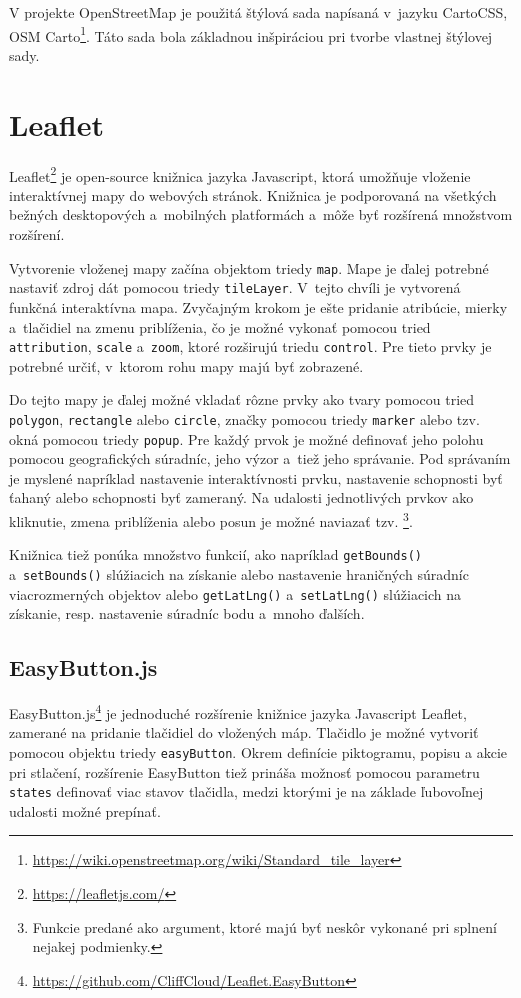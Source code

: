 V projekte OpenStreetMap je použitá štýlová sada napísaná v~jazyku CartoCSS, OSM Carto\footnote{\url{https://wiki.openstreetmap.org/wiki/Standard_tile_layer}}. Táto sada bola základnou inšpiráciou pri tvorbe vlastnej štýlovej sady.


\section{Leaflet}
\label{leaflet}
Leaflet\footnote{\url{https://leafletjs.com/}} je open-source knižnica jazyka Javascript, ktorá umožňuje vloženie interaktívnej mapy do webových stránok. Knižnica je podporovaná na všetkých bežných desktopových a~mobilných platformách a~môže byť rozšírená množstvom rozšírení.

Vytvorenie vloženej mapy začína objektom triedy {\tt map}. Mape je ďalej potrebné nastaviť zdroj dát pomocou triedy {\tt tileLayer}. V~tejto chvíli je vytvorená funkčná interaktívna mapa. Zvyčajným krokom je ešte pridanie atribúcie,  mierky a~tlačidiel na zmenu priblíženia, čo je možné vykonať pomocou tried {\tt attribution}, {\tt scale} a~{\tt zoom}, ktoré rozširujú triedu {\tt control}. Pre tieto prvky je potrebné určiť, v~ktorom rohu mapy majú byť zobrazené.

Do tejto mapy je ďalej možné vkladať rôzne prvky ako tvary pomocou tried {\tt polygon}, {\tt rectangle} alebo {\tt circle}, značky pomocou triedy {\tt marker} alebo tzv.  okná pomocou triedy {\tt popup}. Pre každý prvok je možné definovať jeho polohu pomocou geografických súradníc, jeho výzor a~tiež jeho správanie. Pod správaním je myslené napríklad nastavenie interaktívnosti prvku, nastavenie schopnosti byť ťahaný alebo schopnosti byť zameraný. Na udalosti jednotlivých prvkov ako kliknutie, zmena priblíženia alebo posun je možné naviazať tzv. \footnote{Funkcie predané ako argument, ktoré majú byť neskôr vykonané pri splnení nejakej podmienky.}.

Knižnica tiež ponúka množstvo funkcií, ako napríklad {\tt getBounds()} a~{\tt setBounds()} slúžiacich na získanie alebo nastavenie hraničných súradníc viacrozmerných objektov alebo {\tt getLatLng()} a~{\tt setLatLng()} slúžiacich na získanie, resp. nastavenie súradníc bodu a~mnoho ďalších.

\subsection*{EasyButton.js}
\label{easybutton}
EasyButton.js\footnote{\url{https://github.com/CliffCloud/Leaflet.EasyButton}} je jednoduché rozšírenie knižnice jazyka Javascript Leaflet, zamerané na pridanie tlačidiel do vložených máp. Tlačidlo je možné vytvoriť pomocou objektu triedy {\tt easyButton}. Okrem definície piktogramu, popisu a akcie pri stlačení, rozšírenie EasyButton tiež prináša možnosť pomocou parametru {\tt states} definovať viac stavov tlačidla, medzi ktorými je na základe ľubovoľnej udalosti možné prepínať.

